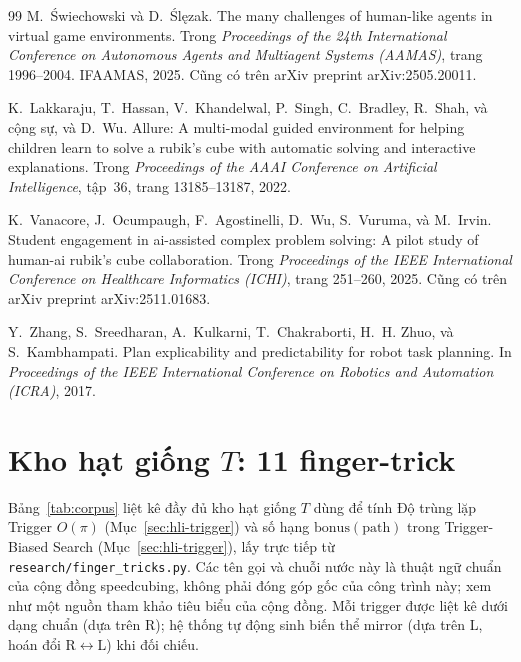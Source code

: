 \documentclass[10pt,conference]{article}
\begin{document}
\begin{thebibliography}{99}
M.~Świechowski và D.~Ślęzak.
\newblock The many challenges of human-like agents in virtual game
  environments.
\newblock Trong \emph{Proceedings of the 24th International Conference on
  Autonomous Agents and Multiagent Systems (AAMAS)}, trang 1996--2004.
  IFAAMAS, 2025.
\newblock Cũng có trên arXiv preprint arXiv:2505.20011.

K.~Lakkaraju, T.~Hassan, V.~Khandelwal, P.~Singh, C.~Bradley, R.~Shah,
  và cộng sự, và D.~Wu.
\newblock Allure: A multi-modal guided environment for helping children
  learn to solve a rubik's cube with automatic solving and interactive
  explanations.
\newblock Trong \emph{Proceedings of the AAAI Conference on Artificial
  Intelligence}, tập~36, trang 13185--13187, 2022.

K.~Vanacore, J.~Ocumpaugh, F.~Agostinelli, D.~Wu, S.~Vuruma, và M.~Irvin.
\newblock Student engagement in ai-assisted complex problem solving: A
  pilot study of human-ai rubik's cube collaboration.
\newblock Trong \emph{Proceedings of the IEEE International Conference on
  Healthcare Informatics (ICHI)}, trang 251--260, 2025.
\newblock Cũng có trên arXiv preprint arXiv:2511.01683.

Y.~Zhang, S.~Sreedharan, A.~Kulkarni, T.~Chakraborti, H.~H. Zhuo, và
  S.~Kambhampati.
\newblock Plan explicability and predictability for robot task planning.
\newblock In \emph{Proceedings of the IEEE International Conference on
  Robotics and Automation (ICRA)}, 2017.

\end{thebibliography}

\appendix
\section{Kho hạt giống $T$: 11 finger-trick}
\label{app:corpus}

Bảng~\ref{tab:corpus} liệt kê đầy đủ kho hạt giống $T$ dùng để tính
Độ trùng lặp Trigger $O(\pi)$ (Mục~\ref{sec:hli-trigger}) và số hạng
$\mathrm{bonus}(\mathrm{path})$ trong Trigger-Biased Search
(Mục~\ref{sec:hli-trigger}), lấy trực tiếp từ
\texttt{research/finger\_tricks.py}. Các tên gọi và chuỗi nước này là
thuật ngữ chuẩn của cộng đồng speedcubing, không phải đóng góp gốc của
công trình này; xem \citet{jperm-fingertricks} như một nguồn tham
khảo tiêu biểu của cộng đồng. Mỗi trigger được liệt kê dưới
dạng chuẩn (dựa trên R); hệ thống tự động sinh biến thể mirror (dựa
trên L, hoán đổi R$\leftrightarrow$L) khi đối chiếu.
\end{document}
